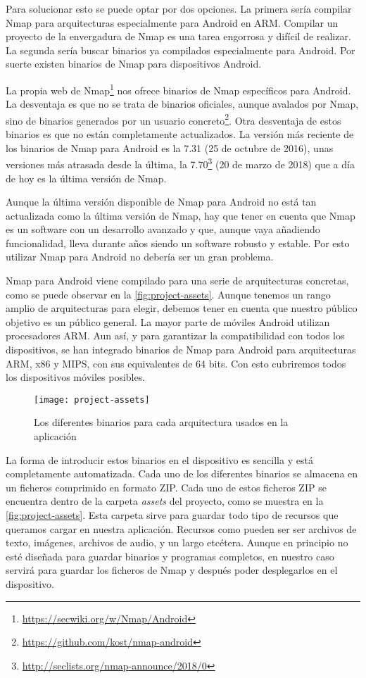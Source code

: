 Para solucionar esto se puede optar por dos opciones. La primera sería compilar Nmap para arquitecturas especialmente para Android en ARM. Compilar un proyecto de la envergadura de Nmap es una tarea engorrosa y difícil de realizar. La segunda sería buscar binarios ya compilados especialmente para Android. Por suerte existen binarios de Nmap para dispositivos Android.

La propia web de Nmap\footnote{\url{https://secwiki.org/w/Nmap/Android}} nos ofrece binarios de Nmap específicos para Android. La desventaja es que no se trata de binarios oficiales, aunque avalados por Nmap, sino de binarios generados por un usuario concreto\footnote{\url{https://github.com/kost/nmap-android}}. Otra desventaja de estos binarios es que no están completamente actualizados. La versión más reciente de los binarios de Nmap para Android es la 7.31 (25 de octubre de 2016), unas versiones más atrasada desde la última, la 7.70\footnote{\url{http://seclists.org/nmap-announce/2018/0}} (20 de marzo de 2018) que a día de hoy es la última versión de Nmap.

Aunque la última versión disponible de Nmap para Android no está tan actualizada como la última versión de Nmap, hay que tener en cuenta que Nmap es un software con un desarrollo avanzado y que, aunque vaya añadiendo funcionalidad, lleva durante años siendo un software robusto y estable. Por esto utilizar Nmap para Android no debería ser un gran problema.

Nmap para Android viene compilado para una serie de arquitecturas concretas, como se puede observar en la \autoref{fig:project-assets}. Aunque tenemos un rango amplio de arquitecturas para elegir, debemos tener en cuenta que nuestro público objetivo es un público general. La mayor parte de móviles Android utilizan procesadores ARM. Aun así, y para garantizar la compatibilidad con todos los dispositivos, se han integrado binarios de Nmap para Android para arquitecturas ARM, x86 y MIPS, con sus equivalentes de 64 bits. Con esto cubriremos todos los dispositivos móviles posibles.

\begin{figure}[H]
	\centering
	\texttt{[image: project-assets]}
	\caption{Los diferentes binarios para cada arquitectura usados en la aplicación}
	\label{fig:project-assets}
\end{figure}

La forma de introducir estos binarios en el dispositivo es sencilla y está completamente automatizada. Cada uno de los diferentes binarios se almacena en un ficheros comprimido en formato ZIP. Cada uno de estos ficheros ZIP se encuentra dentro de la carpeta \textit{assets} del proyecto, como se muestra en la \autoref{fig:project-assets}. Esta carpeta sirve para guardar todo tipo de recursos que queramos cargar en nuestra aplicación. Recursos como pueden ser ser archivos de texto, imágenes, archivos de audio, y un largo etcétera. Aunque en principio no esté diseñada para guardar binarios y programas completos, en nuestro caso servirá para guardar los ficheros de Nmap y después poder desplegarlos en el dispositivo.


